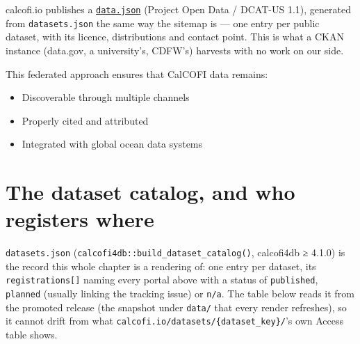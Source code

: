 \documentclass[
  letterpaper,
  DIV=11,
  numbers=noendperiod]{scrreprt}
\providecommand{\tightlist}{%
  \setlength{\itemsep}{0pt}\setlength{\parskip}{0pt}}
\begin{document}
calcofi.io publishes a
\href{https://calcofi.io/data.json}{\texttt{data.json}} (Project Open
Data / DCAT-US 1.1), generated from \texttt{datasets.json} the same way
the sitemap is --- one entry per public dataset, with its licence,
distributions and contact point. This is what a CKAN instance (data.gov,
a university's, CDFW's) harvests with no work on our side.

This federated approach ensures that CalCOFI data remains:

\begin{itemize}
\tightlist
\item
  Discoverable through multiple channels
\item
  Properly cited and attributed
\item
  Integrated with global ocean data systems
\end{itemize}

\section{The dataset catalog, and who registers
where}\label{the-dataset-catalog-and-who-registers-where}

\texttt{datasets.json} (\texttt{calcofi4db::build\_dataset\_catalog()},
calcofi4db ≥ 4.1.0) is the record this whole chapter is a rendering of:
one entry per dataset, its \texttt{registrations{[}{]}} naming every
portal above with a status of \texttt{published}, \texttt{planned}
(usually linking the tracking issue) or \texttt{n/a}. The table below
reads it from the promoted release (the snapshot under \texttt{data/}
that every render refreshes), so it cannot drift from what
\texttt{calcofi.io/datasets/\{dataset\_key\}/}'s own Access table shows.
\end{document}
